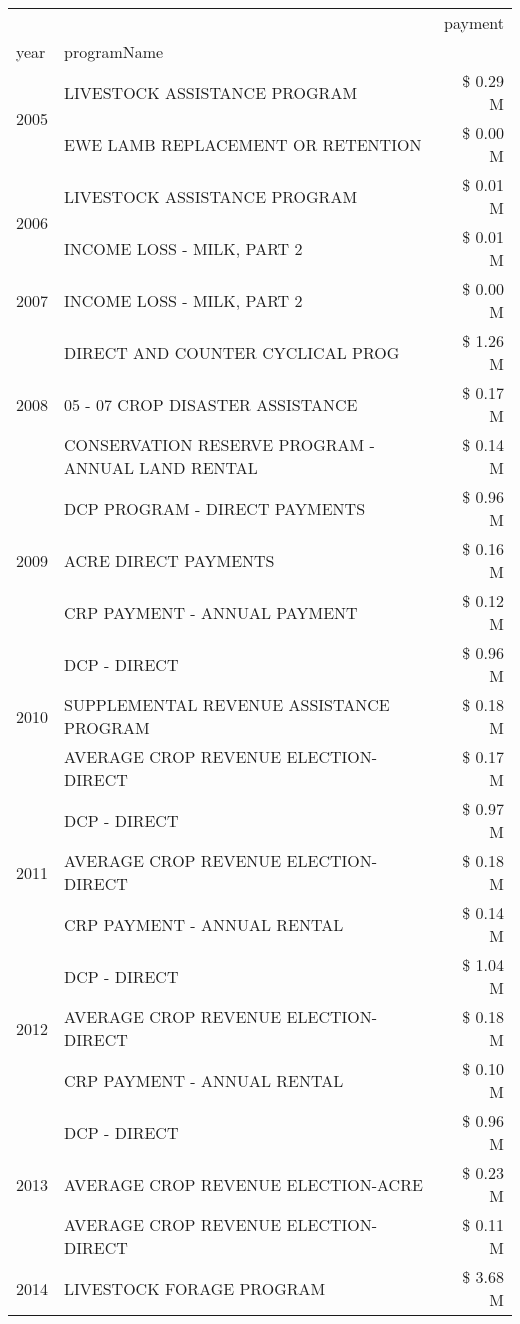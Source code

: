 \begin{tabular}{llr}
\toprule
 &  & payment \\
year & programName &  \\
\midrule
\multirow[t]{2}{*}{2005} & LIVESTOCK ASSISTANCE PROGRAM & \$ 0.29 M \\
 & EWE LAMB REPLACEMENT OR RETENTION & \$ 0.00 M \\
\cline{1-3}
\multirow[t]{2}{*}{2006} & LIVESTOCK ASSISTANCE PROGRAM & \$ 0.01 M \\
 & INCOME LOSS - MILK, PART 2 & \$ 0.01 M \\
\cline{1-3}
2007 & INCOME LOSS - MILK, PART 2 & \$ 0.00 M \\
\cline{1-3}
\multirow[t]{3}{*}{2008} & DIRECT AND COUNTER CYCLICAL PROG & \$ 1.26 M \\
 & 05 - 07 CROP DISASTER ASSISTANCE & \$ 0.17 M \\
 & CONSERVATION RESERVE PROGRAM - ANNUAL LAND RENTAL & \$ 0.14 M \\
\cline{1-3}
\multirow[t]{3}{*}{2009} & DCP PROGRAM - DIRECT PAYMENTS & \$ 0.96 M \\
 & ACRE DIRECT PAYMENTS & \$ 0.16 M \\
 & CRP PAYMENT - ANNUAL PAYMENT & \$ 0.12 M \\
\cline{1-3}
\multirow[t]{3}{*}{2010} & DCP - DIRECT & \$ 0.96 M \\
 & SUPPLEMENTAL REVENUE ASSISTANCE PROGRAM & \$ 0.18 M \\
 & AVERAGE CROP REVENUE ELECTION-DIRECT & \$ 0.17 M \\
\cline{1-3}
\multirow[t]{3}{*}{2011} & DCP - DIRECT & \$ 0.97 M \\
 & AVERAGE CROP REVENUE ELECTION-DIRECT & \$ 0.18 M \\
 & CRP PAYMENT - ANNUAL RENTAL & \$ 0.14 M \\
\cline{1-3}
\multirow[t]{3}{*}{2012} & DCP - DIRECT & \$ 1.04 M \\
 & AVERAGE CROP REVENUE ELECTION-DIRECT & \$ 0.18 M \\
 & CRP PAYMENT - ANNUAL RENTAL & \$ 0.10 M \\
\cline{1-3}
\multirow[t]{3}{*}{2013} & DCP - DIRECT & \$ 0.96 M \\
 & AVERAGE CROP REVENUE ELECTION-ACRE & \$ 0.23 M \\
 & AVERAGE CROP REVENUE ELECTION-DIRECT & \$ 0.11 M \\
\cline{1-3}
\multirow[t]{3}{*}{2014} & LIVESTOCK FORAGE PROGRAM & \$ 3.68 M \\

\end{tabular}
